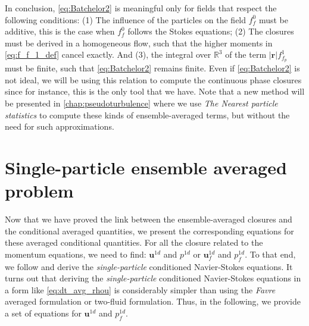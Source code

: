  
In conclusion, \ref{eq:Batchelor2}  is meaningful only for fields that respect the following conditions: 
(1) The influence of the particles on the field $f_f^0$ must be additive, this is the case when ${f_f^0}$ follows the Stokes equations; 
(2) The closures must be derived in a homogeneous flow, such that the higher moments in \ref{eq:f_f_1_def} cancel exactly. 
And (3), the integral over $\mathbb{R}^3$ of the term $|\textbf{r}| f_{f_p}^1$ must be finite, such that \ref{eq:Batchelor2} remains finite. 
Even if \ref{eq:Batchelor2} is not ideal, we will be using this relation to compute the continuous phase closures since for instance, this is the only tool that we have. 
Note that a new method will be presented in \ref{chap:pseudoturbulence} where we use \textit{The Nearest particle statistics} \citep{zhang2021ensemble} to compute these kinds of ensemble-averaged terms, but without the need for such approximations.


\section{Single-particle ensemble averaged problem}
\label{sec:the_disturbance_eq}

Now that we have proved the link between the ensemble-averaged closures and the conditional averaged quantities, we present the corresponding equations for these averaged conditional quantities. 
For all the closure related to the momentum equations, we need to find: $\textbf{u}^{1d}$ and $p^{1d}$ or $\textbf{u}^{1d}_f$ and $p^{1d}_f$. 
To that end, we follow \citep{hinch1977averaged,zhang1994averaged} and derive the \textit{single-particle} conditioned Navier-Stokes equations.
It turns out that deriving the \textit{single-particle} conditioned Navier-Stokes equations in a form like \ref{eq:dt_avg_rhou} is considerably simpler than using the \textit{Favre} averaged formulation or two-fluid formulation. 
Thus, in the following, we provide a set of equations for $\textbf{u}^{1d}$ and $p_f^{1d}$. 

